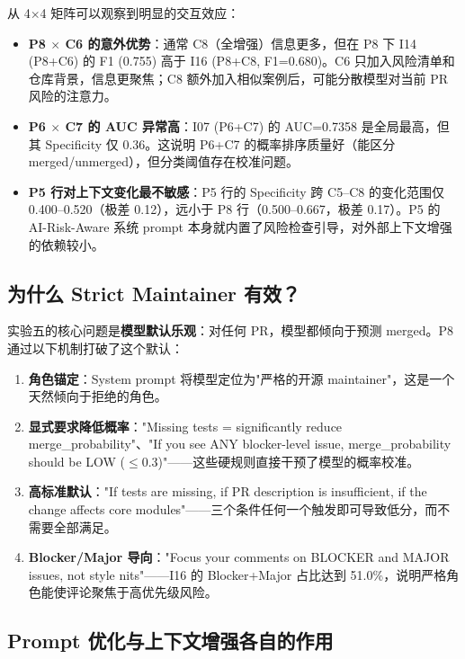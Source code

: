 \documentclass{experimentreport}
\begin{document}
从 4$\times$4 矩阵可以观察到明显的交互效应：

\begin{itemize}
    \item \textbf{P8 $\times$ C6 的意外优势}：通常 C8（全增强）信息更多，但在 P8 下 I14 (P8+C6) 的 F1 (0.755) 高于 I16 (P8+C8, F1=0.680)。C6 只加入风险清单和仓库背景，信息更聚焦；C8 额外加入相似案例后，可能分散模型对当前 PR 风险的注意力。
    \item \textbf{P6 $\times$ C7 的 AUC 异常高}：I07 (P6+C7) 的 AUC=0.7358 是全局最高，但其 Specificity 仅 0.36。这说明 P6+C7 的概率排序质量好（能区分 merged/unmerged），但分类阈值存在校准问题。
    \item \textbf{P5 行对上下文变化最不敏感}：P5 行的 Specificity 跨 C5--C8 的变化范围仅 0.400--0.520（极差 0.12），远小于 P8 行（0.500--0.667，极差 0.17）。P5 的 AI-Risk-Aware 系统 prompt 本身就内置了风险检查引导，对外部上下文增强的依赖较小。
\end{itemize}

\subsection{为什么 Strict Maintainer 有效？}

实验五的核心问题是\textbf{模型默认乐观}：对任何 PR，模型都倾向于预测 merged。P8 通过以下机制打破了这个默认：

\begin{enumerate}
    \item \textbf{角色锚定}：System prompt 将模型定位为"严格的开源 maintainer"，这是一个天然倾向于拒绝的角色。
    \item \textbf{显式要求降低概率}："Missing tests = significantly reduce merge\_probability"、"If you see ANY blocker-level issue, merge\_probability should be LOW ($\le$0.3)"——这些硬规则直接干预了模型的概率校准。
    \item \textbf{高标准默认}："If tests are missing, if PR description is insufficient, if the change affects core modules"——三个条件任何一个触发即可导致低分，而不需要全部满足。
    \item \textbf{Blocker/Major 导向}："Focus your comments on BLOCKER and MAJOR issues, not style nits"——I16 的 Blocker+Major 占比达到 51.0\%，说明严格角色能使评论聚焦于高优先级风险。
\end{enumerate}

\subsection{Prompt 优化与上下文增强各自的作用}
\end{document}
